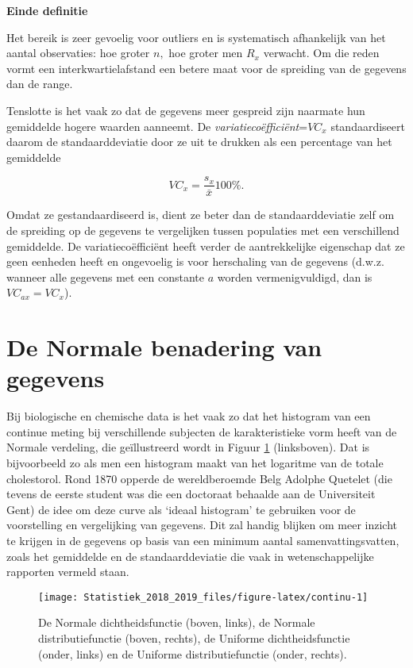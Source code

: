 \documentclass[12pt,dutch,coursenotes]{book}
\theoremstyle{definition}
\theoremstyle{definition}
\theoremstyle{definition}
\theoremstyle{remark}
\begin{document}
\textbf{Einde definitie}

Het bereik is zeer gevoelig voor outliers en is systematisch afhankelijk
van het aantal observaties: hoe groter \(n,\) hoe groter men \(R_x\)
verwacht. Om die reden vormt een interkwartielafstand een betere maat
voor de spreiding van de gegevens dan de range.

Tenslotte is het vaak zo dat de gegevens meer gespreid zijn naarmate hun
gemiddelde hogere waarden aanneemt. De
\emph{variatiecoëfficiënt}=\(VC_x\) standaardiseert daarom de
standaarddeviatie door ze uit te drukken als een percentage van het
gemiddelde

\begin{equation*}
VC_x = \frac{s_x}{\bar{x}} 100\%.
\end{equation*}

Omdat ze gestandaardiseerd is, dient ze beter dan de standaarddeviatie
zelf om de spreiding op de gegevens te vergelijken tussen populaties met
een verschillend gemiddelde. De variatiecoëfficiënt heeft verder de
aantrekkelijke eigenschap dat ze geen eenheden heeft en ongevoelig is
voor herschaling van de gegevens (d.w.z. wanneer alle gegevens met een
constante \(a\) worden vermenigvuldigd, dan is \(VC_{ax}=VC_x\)).

\section{De Normale benadering van gegevens}\label{sec:normal}

Bij biologische en chemische data is het vaak zo dat het histogram van
een continue meting bij verschillende subjecten de karakteristieke vorm
heeft van de Normale verdeling, die geïllustreerd wordt in Figuur
\ref{fig:continu} (linksboven). Dat is bijvoorbeeld zo als men een
histogram maakt van het logaritme van de totale cholestorol. Rond 1870
opperde de wereldberoemde Belg Adolphe Quetelet (die tevens de eerste
student was die een doctoraat behaalde aan de Universiteit Gent) de idee
om deze curve als `ideaal histogram' te gebruiken voor de voorstelling
en vergelijking van gegevens. Dit zal handig blijken om meer inzicht te
krijgen in de gegevens op basis van een minimum aantal
samenvattingsvatten, zoals het gemiddelde en de standaarddeviatie die
vaak in wetenschappelijke rapporten vermeld staan.

\begin{figure}

{\centering \texttt{[image: Statistiek\_2018\_2019\_files/figure-latex/continu-1]} 

}

\caption{De Normale dichtheidsfunctie (boven, links), de Normale distributiefunctie (boven, rechts), de Uniforme dichtheidsfunctie (onder, links) en de Uniforme distributiefunctie (onder, rechts).}\label{fig:continu}
\end{figure}
\end{document}

